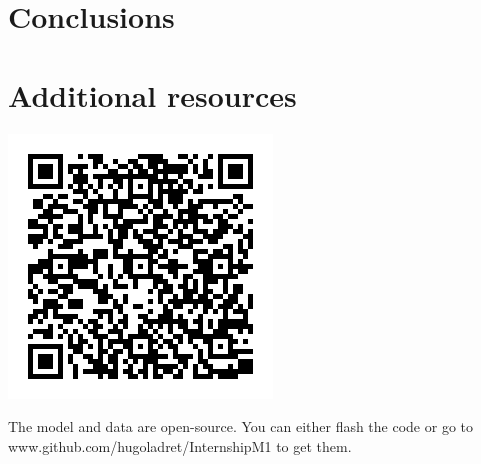 \documentclass[a0,portrait]{a0poster}
\begin{document}
\begin{multicols}{3}
\section*{Conclusions}


\color{Black} %

\section*{Additional resources}

\begin{minipage}{0.3\linewidth}
\includegraphics[width=1.\linewidth]{GitQR.png}
\end{minipage}\hfil
\begin{minipage}{0.67\linewidth}
The model and data are open-source. You can either flash the code or go to www.github.com/hugoladret/InternshipM1 to get them.
\end{minipage}


\end{multicols}
\end{document}
